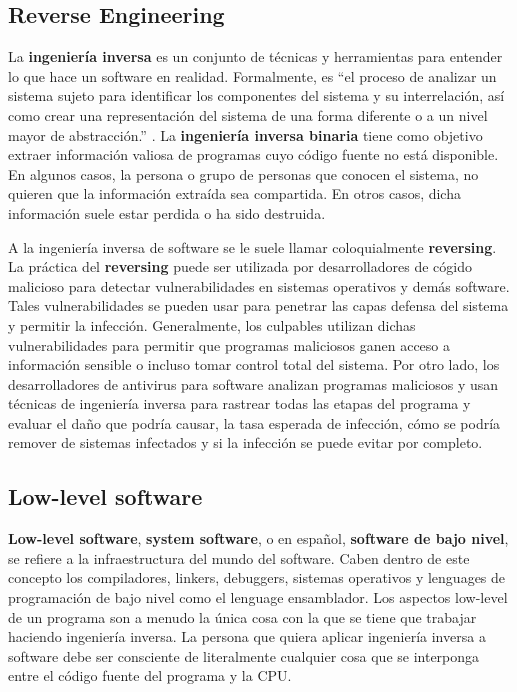
\subsection{Reverse Engineering}

La \textbf{ingeniería inversa} es un conjunto de técnicas y herramientas para entender lo que hace un software en realidad. Formalmente, es ``el proceso de analizar un sistema sujeto para identificar los componentes del sistema y su interrelación, así como crear una representación del sistema de una forma diferente o a un nivel mayor de abstracción.'' \cite{Eld}. La \textbf{ingeniería inversa binaria} tiene como objetivo extraer información valiosa de programas cuyo código fuente no está disponible. En algunos casos, la persona o grupo de personas que conocen el sistema, no quieren que la información extraída sea compartida. En otros casos, dicha información suele estar perdida o ha sido destruida.
\bigskip

A la ingeniería inversa de software se le suele llamar coloquialmente \textbf{reversing}. La práctica del \textbf{reversing} puede ser utilizada por desarrolladores de cógido malicioso para detectar vulnerabilidades en sistemas operativos y demás software. Tales vulnerabilidades se pueden usar para penetrar las capas defensa del sistema y permitir la infección. Generalmente, los culpables utilizan dichas vulnerabilidades para permitir que programas maliciosos ganen acceso a información sensible o incluso tomar control total del sistema. Por otro lado, los desarrolladores de antivirus para software analizan programas maliciosos y usan técnicas de ingeniería inversa para rastrear todas las etapas del programa y evaluar el daño que podría causar, la tasa esperada de infección, cómo se podría remover de sistemas infectados y si la infección se puede evitar por completo.

\subsection{Low-level software}

\textbf{Low-level software}, \textbf{system software}, o en español, \textbf{software de bajo nivel}, se refiere a la infraestructura del mundo del software. Caben dentro de este concepto los compiladores, linkers, debuggers, sistemas operativos y lenguages de programación de bajo nivel como el lenguage ensamblador. Los aspectos low-level de un programa son a menudo la única cosa con la que se tiene que trabajar haciendo ingeniería inversa. La persona que quiera aplicar ingeniería inversa a software debe ser consciente de literalmente cualquier cosa que se interponga entre el código fuente del programa y la CPU.
